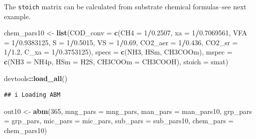 \documentclass[
]{article}
\newenvironment{Shaded}{\begin{snugshade}}{\end{snugshade}}
\newcommand{\AttributeTok}[1]{\textcolor[rgb]{0.13,0.29,0.53}{#1}}
\newcommand{\DecValTok}[1]{\textcolor[rgb]{0.00,0.00,0.81}{#1}}
\newcommand{\FloatTok}[1]{\textcolor[rgb]{0.00,0.00,0.81}{#1}}
\newcommand{\FunctionTok}[1]{\textcolor[rgb]{0.13,0.29,0.53}{\textbf{#1}}}
\newcommand{\NormalTok}[1]{#1}
\newcommand{\OtherTok}[1]{\textcolor[rgb]{0.56,0.35,0.01}{#1}}
\newcommand{\SpecialCharTok}[1]{\textcolor[rgb]{0.81,0.36,0.00}{\textbf{#1}}}
\newcommand{\StringTok}[1]{\textcolor[rgb]{0.31,0.60,0.02}{#1}}
\begin{document}
The \texttt{stoich} matrix can be calculated from substrate chemical
formulas--see next example.

\begin{Shaded}
\begin{Highlighting}[]
\NormalTok{chem\_pars10 }\OtherTok{\textless{}{-}} \FunctionTok{list}\NormalTok{(}\AttributeTok{COD\_conv =} \FunctionTok{c}\NormalTok{(}\AttributeTok{CH4 =} \DecValTok{1}\SpecialCharTok{/}\FloatTok{0.2507}\NormalTok{, }\AttributeTok{xa =} \DecValTok{1}\SpecialCharTok{/}\FloatTok{0.7069561}\NormalTok{,}
                               \AttributeTok{VFA =} \DecValTok{1}\SpecialCharTok{/}\FloatTok{0.9383125}\NormalTok{, }\AttributeTok{S =} \DecValTok{1}\SpecialCharTok{/}\FloatTok{0.5015}\NormalTok{, }\AttributeTok{VS =} \DecValTok{1}\SpecialCharTok{/}\FloatTok{0.69}\NormalTok{, }
                               \AttributeTok{CO2\_aer =} \DecValTok{1}\SpecialCharTok{/}\FloatTok{0.436}\NormalTok{, }\AttributeTok{CO2\_sr =} \DecValTok{1}\SpecialCharTok{/}\FloatTok{1.2}\NormalTok{, }
                               \AttributeTok{C\_xa =} \DecValTok{1}\SpecialCharTok{/}\FloatTok{0.3753125}\NormalTok{),}
                    \AttributeTok{specs =} \FunctionTok{c}\NormalTok{(}\StringTok{\textquotesingle{}NH3\textquotesingle{}}\NormalTok{, }\StringTok{\textquotesingle{}HSm\textquotesingle{}}\NormalTok{, }\StringTok{\textquotesingle{}CH3COOm\textquotesingle{}}\NormalTok{),}
                    \AttributeTok{mspec =} \FunctionTok{c}\NormalTok{(}\AttributeTok{NH3 =} \StringTok{\textquotesingle{}NH4p\textquotesingle{}}\NormalTok{, }\AttributeTok{HSm =} \StringTok{\textquotesingle{}H2S\textquotesingle{}}\NormalTok{, }\AttributeTok{CH3COOm =} \StringTok{\textquotesingle{}CH3COOH\textquotesingle{}}\NormalTok{),}
                    \AttributeTok{stoich =}\NormalTok{ smat)}
\end{Highlighting}
\end{Shaded}

\begin{Shaded}
\begin{Highlighting}[]
\NormalTok{devtools}\SpecialCharTok{::}\FunctionTok{load\_all}\NormalTok{()}
\end{Highlighting}
\end{Shaded}

\begin{verbatim}
## i Loading ABM
\end{verbatim}

\begin{Shaded}
\begin{Highlighting}[]
\NormalTok{out10 }\OtherTok{\textless{}{-}} \FunctionTok{abm}\NormalTok{(}\DecValTok{365}\NormalTok{,}
            \AttributeTok{mng\_pars =}\NormalTok{ mng\_pars,}
            \AttributeTok{man\_pars =}\NormalTok{ man\_pars10,}
            \AttributeTok{grp\_pars =}\NormalTok{ grp\_pars,}
            \AttributeTok{mic\_pars =}\NormalTok{ mic\_pars,}
            \AttributeTok{sub\_pars =}\NormalTok{ sub\_pars10,}
            \AttributeTok{chem\_pars =}\NormalTok{ chem\_pars10)}
\end{Highlighting}
\end{Shaded}
\end{document}
